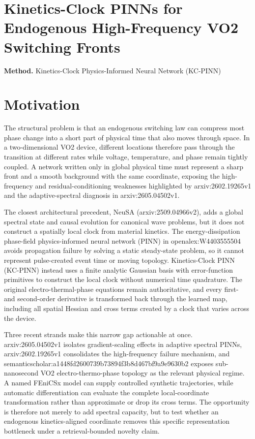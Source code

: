 \documentclass[10pt,a4paper]{article}
\begin{document}
\section*{Kinetics-Clock PINNs for Endogenous High-Frequency VO2 Switching Fronts}
\textbf{Method.} Kinetics-Clock Physics-Informed Neural Network (KC-PINN)
\section*{Motivation}
The structural problem is that an endogenous switching law can compress most phase change into a short part of physical time that also moves through space. In a two-dimensional VO2 device, different locations therefore pass through the transition at different rates while voltage, temperature, and phase remain tightly coupled. A network written only in global physical time must represent a sharp front and a smooth background with the same coordinate, exposing the high-frequency and residual-conditioning weaknesses highlighted by arxiv:2602.19265v1 and the adaptive-spectral diagnosis in arxiv:2605.04502v1.

The closest architectural precedent, NeuSA (arxiv:2509.04966v2), adds a global spectral state and causal evolution for canonical wave problems, but it does not construct a spatially local clock from material kinetics. The energy-dissipation phase-field physics-informed neural network (PINN) in openalex:W4403555504 avoids propagation failure by solving a static steady-state problem, so it cannot represent pulse-created event time or moving topology. Kinetics-Clock PINN (KC-PINN) instead uses a finite analytic Gaussian basis with error-function primitives to construct the local clock without numerical time quadrature. The original electro-thermal-phase equations remain authoritative, and every first- and second-order derivative is transformed back through the learned map, including all spatial Hessian and cross terms created by a clock that varies across the device.

Three recent strands make this narrow gap actionable at once. arxiv:2605.04502v1 isolates gradient-scaling effects in adaptive spectral PINNs, arxiv:2602.19265v1 consolidates the high-frequency failure mechanism, and semanticscholar:a1448fd2600739b73894f3b8d467bf9a9e9630b2 exposes sub-nanosecond VO2 electro-thermo-phase topology as the relevant physical regime. A named FEniCSx model can supply controlled synthetic trajectories, while automatic differentiation can evaluate the complete local-coordinate transformation rather than approximate or drop its cross terms. The opportunity is therefore not merely to add spectral capacity, but to test whether an endogenous kinetics-aligned coordinate removes this specific representation bottleneck under a retrieval-bounded novelty claim.
\end{document}
